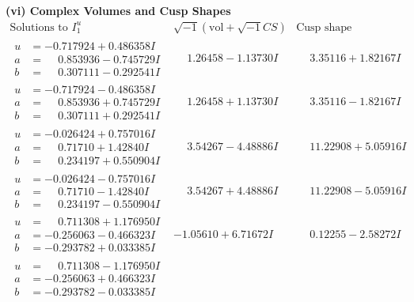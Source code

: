 \documentclass[1p]{elsarticle_modified}
\theoremstyle{definition}
\newcommand{\I}{\sqrt{-1}}
\begin{document}
\newpage\flushleft \textbf{(vi) Complex Volumes and Cusp Shapes}
$$\begin{array}{c|c|c}  
\text{Solutions to }I^u_{1}& \I (\text{vol} + \sqrt{-1}CS) & \text{Cusp shape}\\
 \hline 
\begin{aligned}
u &= -0.717924 + 0.486358 I \\
a &= \phantom{-}0.853936 - 0.745729 I \\
b &= \phantom{-}0.307111 - 0.292541 I\end{aligned}
 & \phantom{-}1.26458 - 1.13730 I & \phantom{-}3.35116 + 1.82167 I \\ \hline\begin{aligned}
u &= -0.717924 - 0.486358 I \\
a &= \phantom{-}0.853936 + 0.745729 I \\
b &= \phantom{-}0.307111 + 0.292541 I\end{aligned}
 & \phantom{-}1.26458 + 1.13730 I & \phantom{-}3.35116 - 1.82167 I \\ \hline\begin{aligned}
u &= -0.026424 + 0.757016 I \\
a &= \phantom{-}0.71710 + 1.42840 I \\
b &= \phantom{-}0.234197 + 0.550904 I\end{aligned}
 & \phantom{-}3.54267 - 4.48886 I & \phantom{-}11.22908 + 5.05916 I \\ \hline\begin{aligned}
u &= -0.026424 - 0.757016 I \\
a &= \phantom{-}0.71710 - 1.42840 I \\
b &= \phantom{-}0.234197 - 0.550904 I\end{aligned}
 & \phantom{-}3.54267 + 4.48886 I & \phantom{-}11.22908 - 5.05916 I \\ \hline\begin{aligned}
u &= \phantom{-}0.711308 + 1.176950 I \\
a &= -0.256063 - 0.466323 I \\
b &= -0.293782 + 0.033385 I\end{aligned}
 & -1.05610 + 6.71672 I & \phantom{-}0.12255 - 2.58272 I \\ \hline\begin{aligned}
u &= \phantom{-}0.711308 - 1.176950 I \\
a &= -0.256063 + 0.466323 I \\
b &= -0.293782 - 0.033385 I\end{aligned}

\end{array}$$
\end{document}
